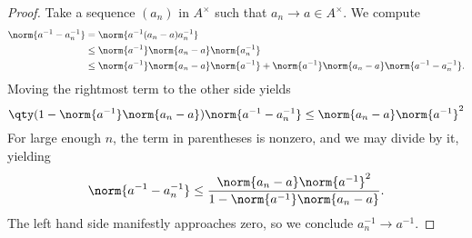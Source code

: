 \begin{proof}
Take a sequence $(a_n)$ in $A^\times$ such that $a_n \rightarrow a \in A^\times$. We compute
\begin{equation}
\begin{aligned}
\norm{a^{-1} - a_n^{-1}} &= \norm{a^{-1} (a_n - a)a^{-1}_n}\\
&\leq \norm{a^{-1}} \norm{a_n - a}\norm{a_n^{-1}}\\
&\leq \norm{a^{-1}}\norm{a_n - a}\norm{a^{-1}} + \norm{a^{-1}}\norm{a_n - a}\norm{a^{-1} - a_n^{-1}}.
\end{aligned}
\end{equation}
Moving the rightmost term to the other side yields
\begin{equation}
\qty(1 - \norm{a^{-1}}\norm{a_n - a})\norm{a^{-1} - a_n^{-1}} \leq  \norm{a_n - a} \norm{a^{-1}}^2
\end{equation}
For large enough $n$, the term in parentheses is nonzero, and we may divide by it, yielding
\begin{equation}
\norm{a^{-1} - a_n^{-1}} \leq \frac{\norm{a_n - a}\norm{a^{-1}}^2}{1 - \norm{a^{-1}}\norm{a_n - a}}.
\end{equation}
The left hand side manifestly approaches zero, so we conclude $a_n^{-1} \rightarrow a^{-1}$.
\end{proof}





